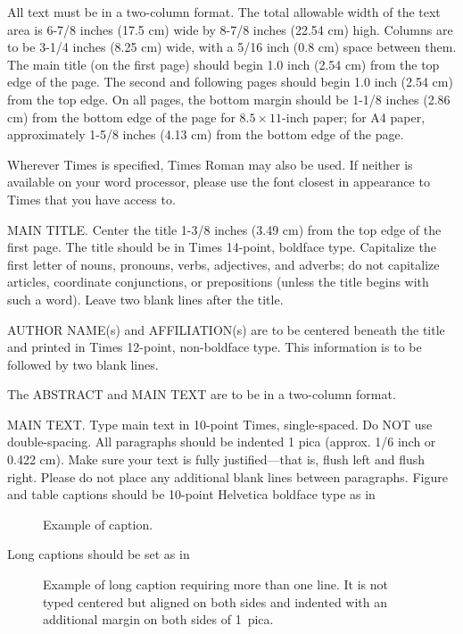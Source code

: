 \documentclass[times, 10pt,twocolumn]{article}
\begin{document}

All text must be in a two-column format. The total allowable width of 
the text area is 6-7/8 inches (17.5 cm) wide by 8-7/8 inches (22.54 cm) 
high. Columns are to be 3-1/4 inches (8.25 cm) wide, with a 5/16 inch 
(0.8 cm) space between them. The main title (on the first page) should 
begin 1.0 inch (2.54 cm) from the top edge of the page. The second and 
following pages should begin 1.0 inch (2.54 cm) from the top edge. On 
all pages, the bottom margin should be 1-1/8 inches (2.86 cm) from the 
bottom edge of the page for $8.5 \times 11$-inch paper; for A4 paper, 
approximately 1-5/8 inches (4.13 cm) from the bottom edge of the page.


Wherever Times is specified, Times Roman may also be used. If neither is 
available on your word processor, please use the font closest in 
appearance to Times that you have access to.

MAIN TITLE. Center the title 1-3/8 inches (3.49 cm) from the top edge of 
the first page. The title should be in Times 14-point, boldface type. 
Capitalize the first letter of nouns, pronouns, verbs, adjectives, and 
adverbs; do not capitalize articles, coordinate conjunctions, or 
prepositions (unless the title begins with such a word). Leave two blank 
lines after the title.

AUTHOR NAME(s) and AFFILIATION(s) are to be centered beneath the title 
and printed in Times 12-point, non-boldface type. This information is to 
be followed by two blank lines.

The ABSTRACT and MAIN TEXT are to be in a two-column format. 

MAIN TEXT. Type main text in 10-point Times, single-spaced. Do NOT use 
double-spacing. All paragraphs should be indented 1 pica (approx. 1/6 
inch or 0.422 cm). Make sure your text is fully justified---that is, 
flush left and flush right. Please do not place any additional blank 
lines between paragraphs. Figure and table captions should be 10-point 
Helvetica boldface type as in
\begin{figure}[h]
   \caption{Example of caption.}
\end{figure}

\noindent Long captions should be set as in 
\begin{figure}[h] 
   \caption{Example of long caption requiring more than one line. It is 
     not typed centered but aligned on both sides and indented with an 
     additional margin on both sides of 1~pica.}
\end{figure}
\end{document}
